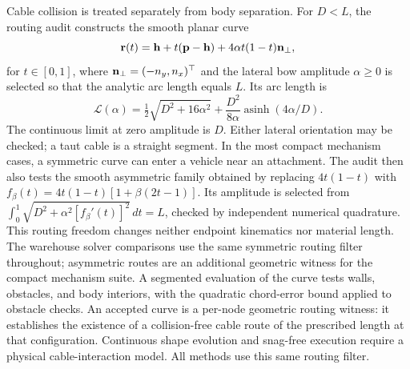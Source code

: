 Cable collision is treated separately from body separation. For $D<L$, the routing audit constructs the smooth planar curve
\begin{equation}
\mathbf r(t)=\mathbf h+t(\mathbf p-\mathbf h)+4\alpha t(1-t)\mathbf n_\perp,
\label{eq:route}
\end{equation}
for $t\in[0,1]$, where $\mathbf n_\perp=(-n_y,n_x)^\top$ and the lateral bow amplitude $\alpha\geq0$ is selected so that the analytic arc length equals $L$. Its arc length is
\begin{equation}
\mathcal L(\alpha)=\tfrac12\sqrt{D^2+16\alpha^2}
+\frac{D^2}{8\alpha}\operatorname{asinh}(4\alpha/D).
\label{eq:arclength}
\end{equation}
The continuous limit at zero amplitude is $D$. Either lateral orientation may be checked; a taut cable is a straight segment. In the most compact mechanism cases, a symmetric curve can enter a vehicle near an attachment. The audit then also tests the smooth asymmetric family obtained by replacing $4t(1-t)$ with $f_\beta(t)=4t(1-t)[1+\beta(2t-1)]$. Its amplitude is selected from $\int_0^1\sqrt{D^2+\alpha^2[f_\beta' (t)]^2}\,dt=L$, checked by independent numerical quadrature. This routing freedom changes neither endpoint kinematics nor material length. The warehouse solver comparisons use the same symmetric routing filter throughout; asymmetric routes are an additional geometric witness for the compact mechanism suite. A segmented evaluation of the curve tests walls, obstacles, and body interiors, with the quadratic chord-error bound applied to obstacle checks. An accepted curve is a per-node geometric routing witness: it establishes the existence of a collision-free cable route of the prescribed length at that configuration. Continuous shape evolution and snag-free execution require a physical cable-interaction model. All methods use this same routing filter.

